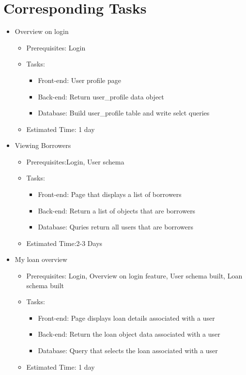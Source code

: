\section{Corresponding Tasks}

\begin{itemize}
	\item Overview on login
	\begin{itemize}
		\item Prerequisites: Login
		\item Tasks:
		\begin{itemize}
			\item Front-end: User profile page
			\item Back-end: Return user\_profile data object
			\item Database: Build user\_profile table and write selct queries
		\end{itemize}
		\item Estimated Time: 1 day
	\end{itemize}

	\item Viewing Borrowers
	\begin{itemize}
		\item Prerequisites:Login, User schema
		\item Tasks:
		\begin{itemize}
			\item Front-end: Page that displays a list of borrowers
			\item Back-end: Return a list of objects that are borrowers
			\item Database: Quries return all users that are borrowers
		\end{itemize}
		\item Estimated Time:2-3 Days
	\end{itemize}

	\item My loan overview
	\begin{itemize}
		\item Prerequisites: Login, Overview on login feature, User schema built, Loan schema built
		\item Tasks:
		\begin{itemize}
			\item Front-end: Page displays loan details associated with a user
			\item Back-end: Return the loan object data associated with a user
			\item Database: Query that selects the loan associated with a user
		\end{itemize}
		\item Estimated Time: 1 day
	\end{itemize}


\end{itemize}
